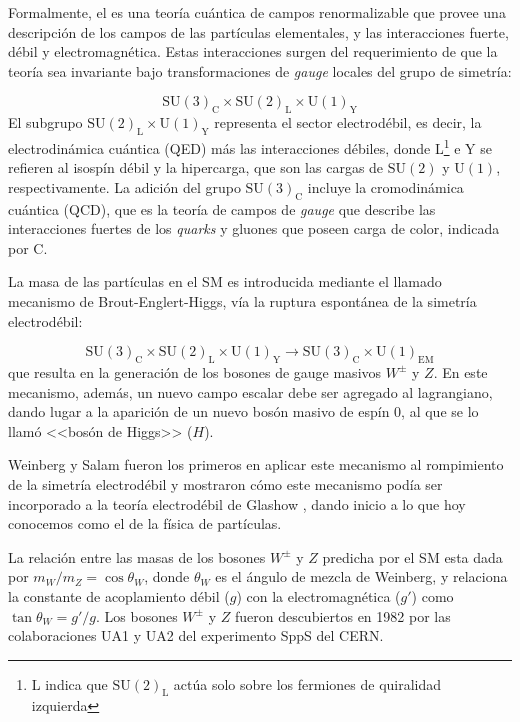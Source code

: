 Formalmente, el {\SM} es una teoría cuántica de campos renormalizable que provee
una descripción de los campos de las partículas elementales, y las interacciones
fuerte, débil y electromagnética. Estas interacciones surgen del requerimiento
de que la teoría sea invariante bajo transformaciones de \emph{gauge} locales del grupo
de simetría:

\begin{equation}
  \text{SU}(3)_\text{C} \times \text{SU}(2)_\text{L} \times \text{U}(1)_\text{Y}
\end{equation}
%
El subgrupo $\text{SU}(2)_\text{L} \times \text{U}(1)_\text{Y}$ representa el sector
electrodébil, es decir, la electrodinámica cuántica (QED) más las interacciones
débiles, donde L\footnote{L indica que $\text{SU}(2)_\text{L}$ actúa solo sobre los
  fermiones de quiralidad izquierda} e Y se refieren al isospín débil y la
hipercarga, que son las cargas de $\text{SU}(2)$ y $\text{U}(1)$,
respectivamente. La adición del grupo $\text{SU}(3)_\text{C}$ incluye la cromodinámica
cuántica (QCD), que es la teoría de campos de \emph{gauge} que describe las
interacciones fuertes de los \emph{quarks} y gluones que poseen carga de color,
indicada por C.

La masa de las partículas en el SM es introducida mediante el llamado mecanismo
de Brout-Englert-Higgs\cite{PhysRevLett.13.321,PhysRevLett.13.508}, vía la
ruptura espontánea de la simetría electrodébil:

\begin{equation}
  \text{SU}(3)_\text{C} \times \text{SU}(2)_\text{L} \times \text{U}(1)_\text{Y} \to \text{SU}(3)_\text{C}
  \times \text{U}(1)_\text{EM}
\end{equation}
%
que resulta en la generación de los bosones de gauge masivos $W^\pm$ y $Z$.
En este mecanismo, además, un nuevo campo escalar debe ser agregado al
lagrangiano, dando lugar a la aparición de un nuevo bosón masivo de espín
0, al que se lo llamó <<bosón de Higgs>> ($H$).

Weinberg y Salam fueron los primeros en aplicar este mecanismo al
rompimiento de la simetría electrodébil
\cite{PhysRevLett.19.1264,PhysRev.127.965} y mostraron cómo este mecanismo podía
ser incorporado a la teoría electrodébil de Glashow \cite{Glashow1961579}, dando
inicio a lo que hoy conocemos como el {\SM} de la física de partículas.

La relación entre las masas de los bosones $W^\pm$ y $Z$ predicha por el SM esta
dada por $m_W/m_Z = \cos \theta_W$, donde $\theta_W$ es el ángulo de
mezcla de Weinberg, y relaciona la constante de acoplamiento débil ($g$) con la
electromagnética ($g'$) como $\tan\theta_W = g'/g$. Los bosones $W^\pm$ y $Z$
fueron descubiertos en 1982 por las colaboraciones UA1 y UA2 del experimento
SppS del CERN.

